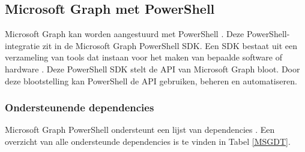 
\subsection{Microsoft Graph met PowerShell}

Microsoft Graph kan worden aangestuurd met PowerShell \autocite{Microsoft2023j}. Deze PowerShell-integratie zit in de Microsoft Graph PowerShell \ac{SDK}. Een \ac{SDK} bestaat uit een verzameling van tools dat instaan voor het maken van bepaalde software of hardware \autocite{RedHat2020}. Deze PowerShell \ac{SDK} stelt de \ac{API} van Microsoft Graph bloot. Door deze blootstelling kan PowerShell de \ac{API} gebruiken, beheren en automatiseren.

\subsubsection{Ondersteunende dependencies}

Microsoft Graph PowerShell ondersteunt een lijst van dependencies \autocite{Microsoft2023k}. Een overzicht van alle ondersteunde dependencies is te vinden in Tabel \ref{MSGDT}. 

